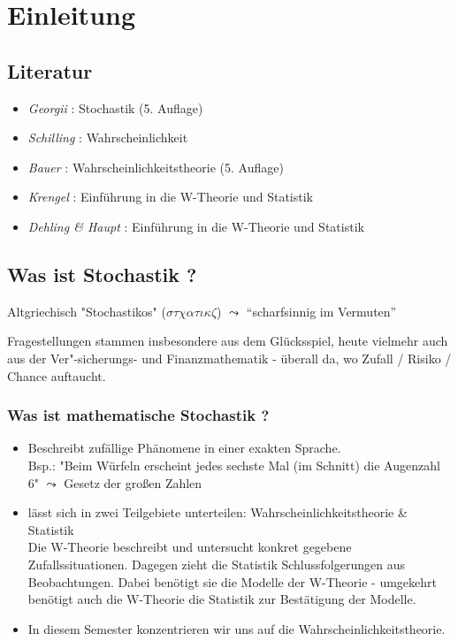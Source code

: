 \chapter{Einleitung}

\section*{Literatur}
\begin{itemize}[nolistsep]
    \item \textit{Georgii} : Stochastik (5. Auflage)
    \item \textit{Schilling} : Wahrscheinlichkeit
    \item \textit{Bauer} : Wahrscheinlichkeitstheorie (5. Auflage)
    \item \textit{Krengel} : Einführung in die W-Theorie und Statistik
    \item \textit{Dehling \& Haupt} : Einführung in die W-Theorie und Statistik
\end{itemize}

\section*{Was ist Stochastik ?}

Altgriechisch "Stochastikos" ($\sigma \tau  \chi \alpha \tau \iota \kappa  \zeta$) $\leadsto$ ``scharfsinnig im Vermuten'' %

Fragestellungen stammen insbesondere aus dem Glücksspiel, heute vielmehr auch aus der Ver"-sicherungs- und Finanzmathematik - überall da, wo Zufall / Risiko / Chance auftaucht.

\subsection*{Was ist mathematische Stochastik ?}
\begin{itemize}[leftmargin=*]
    \item Beschreibt zufällige Phänomene in einer exakten Sprache. \\
    Bsp.: "Beim Würfeln erscheint jedes sechste Mal (im Schnitt) die Augenzahl 6" $\leadsto$ Gesetz der großen Zahlen
    \item lässt sich in zwei Teilgebiete unterteilen: Wahrscheinlichkeitstheorie \& Statistik \\
    Die W-Theorie beschreibt und untersucht konkret gegebene Zufallssituationen. Dagegen zieht die Statistik Schlussfolgerungen aus Beobachtungen. Dabei benötigt sie die Modelle der W-Theorie - umgekehrt benötigt auch die W-Theorie die Statistik zur Bestätigung der Modelle.
    \item In diesem Semester konzentrieren wir uns auf die Wahrscheinlichkeitstheorie.
\end{itemize}

